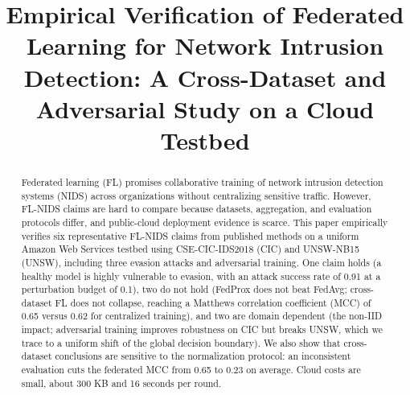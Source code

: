 \documentclass[conference]{IEEEtran}
\begin{document}
\title{Empirical Verification of Federated Learning for Network Intrusion
Detection: A Cross-Dataset and Adversarial Study on a Cloud Testbed}

\author{
\and
{}
\and
{}
}

\maketitle

\begin{abstract}
Federated learning (FL) promises collaborative training of network intrusion detection systems (NIDS) across organizations without centralizing sensitive traffic. However, FL-NIDS claims are hard to compare because datasets, aggregation, and evaluation protocols differ, and public-cloud deployment evidence is scarce. This paper empirically verifies six representative FL-NIDS claims from published methods on a uniform Amazon Web Services testbed using CSE-CIC-IDS2018 (CIC) and UNSW-NB15 (UNSW), including three evasion attacks and adversarial training. One claim holds (a healthy model is highly vulnerable to evasion, with an attack success rate of 0.91 at a perturbation budget of 0.1), two do not hold (FedProx does not beat FedAvg; cross-dataset FL does not collapse, reaching a Matthews correlation coefficient (MCC) of 0.65 versus 0.62 for centralized training), and two are domain dependent (the non-IID impact; adversarial training improves robustness on CIC but breaks UNSW, which we trace to a uniform shift of the global decision boundary). We also show that cross-dataset conclusions are sensitive to the normalization protocol: an inconsistent evaluation cuts the federated MCC from 0.65 to 0.23 on average. Cloud costs are small, about 300 KB and 16 seconds per round.
\end{abstract}
\end{document}
